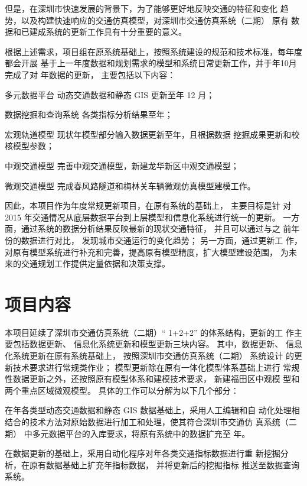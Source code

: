但是，在深圳市快速发展的背景下，为了能够更好地反映交通的特征和变化
趋势，以及构建快速响应的交通仿真模型，对深圳市交通仿真系统（二期） 原有
数据和已建成系统的更新工作具有十分重要的意义。

根据上述需求，项目组在原系统基础上，按照系统建设的规范和技术标准，每年度都会开展
基于上一年度数据和规划需求的模型和系统日常更新工作，并于\pyear 年10月完成了对
\ppyear 年数据的更新， 主要包括以下内容：

\begin{para}
\item[多元数据平台] 动态交通数据和静态 GIS 更新至\ppyear 年 12 月；
\item[数据挖掘和查询系统]各类指标分析结果至\ppyear 年；
\item[宏观轨道模型]现状年模型部分输入数据更新至\ppyear 年，且根据数据
挖掘成果更新和校核模型参数；
\item[中观交通模型]完善中观交通模型，新建龙华新区中观交通模型；
\item[微观交通模型]完成春风路隧道和梅林关车辆微观仿真模型建模工作。
\end{para}

因此，本项目作为年度常规更新项目，在原有系统的基础上， 主要目标是针
对 2015 年交通情况从底层数据平台到上层模型和信息化系统进行统一的更新。
一方面，通过系统的数据分析结果反映最新的现状交通特征， 并且可以通过与之
前年份的数据进行对比， 发现城市交通运行的变化趋势； 另一方面，通过更新工
作， 对原有模型系统进行补充和完善，提高原有模型精度，扩大模型建设范围，
为未来的交通规划工作提供定量依据和决策支撑。

\section{项目内容}
本项目延续了深圳市交通仿真系统（二期）“ 1+2+2” 的体系结构，更新的工
作主要包括数据更新、 信息化系统更新和模型更新三块内容。 其中，数据更新、
信息化系统更新在原有系统基础上， 按照深圳市交通仿真系统（二期） 系统设计
的更新技术要求进行常规类作业； 模型更新除在原有一体化模型体系基础上进行
常规性数据更新之外，还按照原有模型体系和建模技术要求， 新建福田区中观模
型和两个重点区域微观模型。 具体的工作可以分解为以下几个部分：

在\pyear 年各类型动态交通数据和静态 GIS 数据基础上，采用人工编辑和自
动化处理相结合的技术方法对原始数据进行加工和处理，使其符合深圳市交通仿
真系统（二期） 中多元数据平台的入库要求，将原有系统中的数据扩充至 \pyear
年。

在数据更新的基础上，采用自动化程序对\pyear 年各类交通指标数据进行重
新挖掘分析，在原有数据基础上扩充\pyear 年指标数据， 并将更新后的挖掘指标
推送至数据查询系统。

